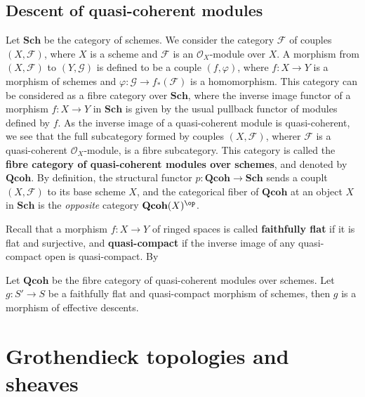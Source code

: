 \subsection{Descent of quasi-coherent modules}
Let $\mathbf{Sch}$ be the category of schemes. We consider the category $\mathcal{F}$ of couples $(X,\mathscr{F})$, where $X$ is a scheme and $\mathscr{F}$ is an $\mathscr{O}_X$-module over $X$. A morphism from $(X,\mathscr{F})$ to $(Y,\mathscr{G})$ is defined to be a couple $(f,\varphi)$, where $f:X\to Y$ is a morphism of schemes and $\varphi:\mathscr{G}\to f_*(\mathscr{F})$ is a homomorphism. This category can be considered as a fibre category over $\mathbf{Sch}$, where the inverse image functor of a morphism $f:X\to Y$ in $\mathbf{Sch}$ is given by the usual pullback functor of modules defined by $f$. As the inverse image of a quasi-coherent module is quasi-coherent, we see that the full subcategory formed by couples $(X,\mathscr{F})$, wherer $\mathscr{F}$ is a quasi-coherent $\mathscr{O}_X$-module, is a fibre subcategory. This category is called the \textbf{fibre category of quasi-coherent modules over schemes}, and denoted by $\mathbf{Qcoh}$. By definition, the structural functor $p:\mathbf{Qcoh}\to \mathbf{Sch}$ sends a couplt $(X,\mathscr{F})$ to its base scheme $X$, and the categorical fiber of $\mathbf{Qcoh}$ at an object $X$ in $\mathbf{Sch}$ is the \textit{opposite} category $\mathbf{Qcoh}(X)^{\op}$.\par
Recall that a morphism $f:X\to Y$ of ringed spaces is called \textbf{faithfully flat} if it is flat and surjective, and \textbf{quasi-compact} if the inverse image of any quasi-compact open is quasi-compact. By 
\begin{theorem}
Let $\mathbf{Qcoh}$ be the fibre category of quasi-coherent modules over schemes. Let $g:S'\to S$ be a faithfully flat and quasi-compact morphism of schemes, then $g$ is a morphism of effective descents.
\end{theorem}
\section{Grothendieck topologies and sheaves}
